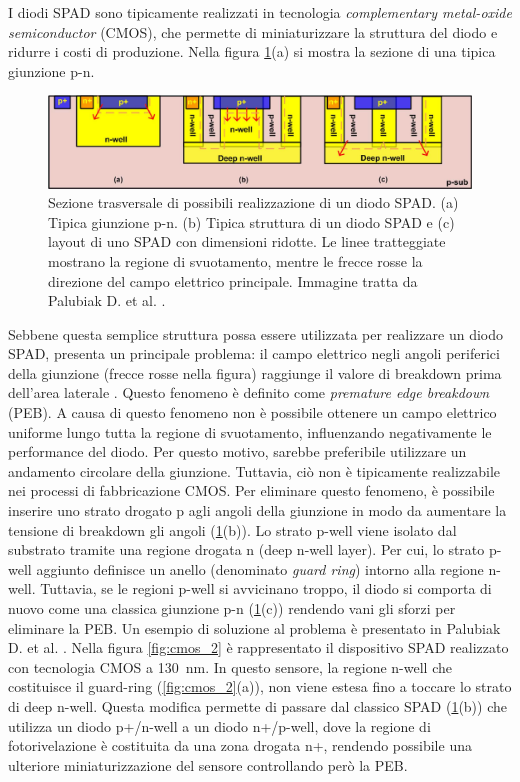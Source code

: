 I diodi SPAD sono tipicamente realizzati in tecnologia \textit{complementary metal-oxide semiconductor} (CMOS), che permette di miniaturizzare la struttura del diodo e ridurre i costi di produzione. Nella figura \ref{fig:cmos}(a) si mostra la sezione di una tipica giunzione p-n.
\begin{figure}[b]
	\centering
	\includegraphics[width=0.8\linewidth]{./ImageFiles/cmos.jpg}
	\caption{Sezione trasversale di possibili realizzazione di un diodo SPAD. (a) Tipica giunzione p-n. (b) Tipica struttura di un diodo SPAD e (c) layout di uno SPAD con dimensioni ridotte. Le linee tratteggiate mostrano la regione di svuotamento, mentre le frecce rosse la direzione del campo elettrico principale. Immagine tratta da Palubiak D. et al. \cite{Palubiak2011}.}
	\label{fig:cmos}
\end{figure} 
Sebbene questa semplice struttura possa essere utilizzata per realizzare un diodo SPAD, presenta un principale problema: il campo elettrico negli angoli periferici della giunzione (frecce rosse nella figura) raggiunge il valore di breakdown prima dell'area laterale \cite{Palubiak2011}. Questo fenomeno è definito come \textit{premature edge breakdown} (PEB). A causa di questo fenomeno non è possibile ottenere un campo elettrico uniforme lungo tutta la regione di svuotamento, influenzando negativamente le performance del diodo. Per questo motivo, sarebbe preferibile utilizzare un andamento circolare della giunzione. Tuttavia, ciò non è tipicamente realizzabile nei processi di fabbricazione CMOS. Per eliminare questo fenomeno, è possibile inserire uno strato drogato p agli angoli della giunzione in modo da aumentare la tensione di breakdown gli angoli (\Fig\ref{fig:cmos}(b)). Lo strato p-well viene isolato dal substrato tramite una regione drogata n (deep n-well layer). Per cui, lo strato p-well aggiunto definisce un anello (denominato \textit{guard ring}) intorno alla regione n-well. Tuttavia, se le regioni p-well si avvicinano troppo, il diodo si comporta di nuovo come una classica giunzione p-n (\Fig\ref{fig:cmos}(c)) rendendo vani gli sforzi per eliminare la PEB. Un esempio di soluzione al problema è presentato in Palubiak D. et al. \cite{Palubiak2011}. Nella figura \ref{fig:cmos_2} è rappresentato il dispositivo SPAD realizzato con tecnologia CMOS a \SI{130}{\nano\meter}. In questo sensore, la regione n-well che costituisce il guard-ring (\Fig\ref{fig:cmos_2}(a)), non viene estesa fino a toccare lo strato di deep n-well. Questa modifica permette di passare dal classico SPAD (\Fig\ref{fig:cmos}(b)) che utilizza un diodo p+/n-well a un diodo n+/p-well, dove la regione di fotorivelazione è costituita da una zona drogata n+, rendendo possibile una ulteriore miniaturizzazione del sensore controllando però la PEB.
